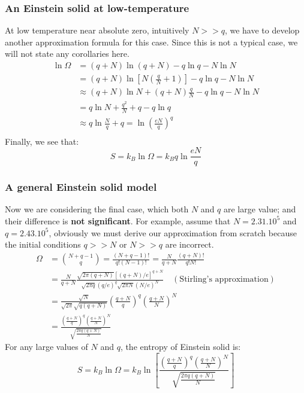 \documentclass[~/PhyAI/phyai.tex]{subfiles}
\begin{document}
\subsubsection{An Einstein solid at low-temperature}
At low temperature near absolute zero, intuitively $N>>q$, we have to develop another approximation formula for this case. Since this is not a typical case, we will not state any corollaries here.
\begin{equation*}
	\begin{split}
		\ln\Omega&=(q+N)\ln{(q+N)}-q\ln{q}-N\ln{N}\\
		&=(q+N)\ln\left[N \left(\frac{q }{N}+1\right)\right]-q\ln{q}-N\ln{N}\\
		&\approx (q+N)\ln{N}+(q+N)\frac{q }{N}-q\ln{q}-N\ln{N}\\
		&=q\ln{N}+\frac{q^{2}}{N}+q-q\ln{q}\\
		&\approx q\ln{\frac{N }{q}}+q=\ln \left(\frac{eN}{q}\right)^{q}\\
	\end{split}
\end{equation*}
Finally, we see that: $$ S=k_{B}\ln{\Omega}=k_{B}q\ln \frac{eN }{q} $$
\subsubsection{A general Einstein solid model}\label{sec:a_general_einstein_solid} %
Now we are considering the final case, which both $N$ and $q$ are large value; and their difference is \textbf{not significant}. For example, assume that $N=2.31.10^{5}$ and $q=2.43.10^{5}$, obviously we must derive our approximation from scratch because the initial conditions $q>>N$ or $N>>q$ are incorrect.
\begin{equation*}
	\begin{split}
		\Omega&=\binom{N+q-1}{q}=\frac{(N+q-1)! }{q!(N-1)!}=\frac{N }{q+N}\frac{(q+N)! }{q!N!}\\
		&=\frac{N }{q+N}\frac{\sqrt{2\pi(q+N)}\left[(q+N)/e\right]^{q+N}}{\sqrt{2\pi q}\left(q/e\right)^{q}\sqrt{2\pi N}(N/e)^{N}}\quad(\text{Stirling's approximation})\\
		&=\frac{\sqrt{N}}{\sqrt{2\pi}\sqrt{q(q+N)}}\left(\frac{q+N }{q}\right)^{q}\left(\frac{q+N }{N}\right)^{N}\\
		&= \frac{\left(\displaystyle\frac{q+N}{q}\right)^{q}\left(\displaystyle\frac{q+N}{N}\right)^{N} }{\sqrt{\displaystyle\frac{2\pi q(q+N)}{N}}}
	\end{split}
\end{equation*}
For any large values of $N$ and $q$, the entropy of Einstein solid is:
\begin{equation*}
	S=k_{B}\ln\Omega=k_{B}\ln\left[\frac{\left(\displaystyle\frac{q+N}{q}\right)^{q}\left(\displaystyle\frac{q+N}{N}\right)^{N} }{\sqrt{\displaystyle\frac{2\pi q(q+N)}{N}}}
		\right]
\end{equation*}
\end{document}
